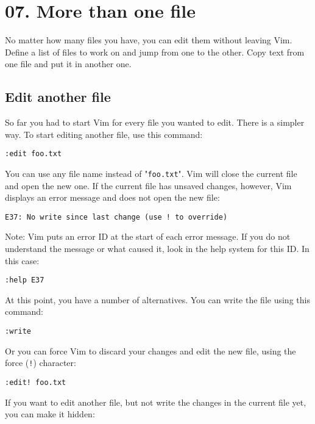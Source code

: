 \section{07. More than one file}
No matter how many files you have, you can edit them without leaving Vim.
Define a list of files to work on and jump from one to the other.
Copy text from one file and put it in another one.
\subsection{Edit another file}

So far you had to start Vim for every file you wanted to edit.
There is a simpler way.
To start editing another file, use this command:

 \begin{Verbatim}[samepage=true]
 :edit foo.txt
 \end{Verbatim}

You can use any file name instead of "\verb!foo.txt!".
Vim will close the current file and open the new one.
If the current file has unsaved changes, however, Vim displays an error message and does not open the new file:

\begin{Verbatim}[samepage=true]
  E37: No write since last change (use ! to override) 
\end{Verbatim}

Note:
Vim puts an error ID at the start of each error message.
If you do not understand the message or what caused it, look in the help system for this ID.
In this case:

\begin{Verbatim}[samepage=true]
  :help E37
\end{Verbatim}

At this point, you have a number of alternatives.
You can write the file using this command:

 \begin{Verbatim}[samepage=true]
 :write
 \end{Verbatim}

Or you can force Vim to discard your changes and edit the new file, using the force (\verb:!:) character:

 \begin{Verbatim}[samepage=true]
 :edit! foo.txt
 \end{Verbatim}

If you want to edit another file, but not write the changes in the current file yet, you can make it hidden:

